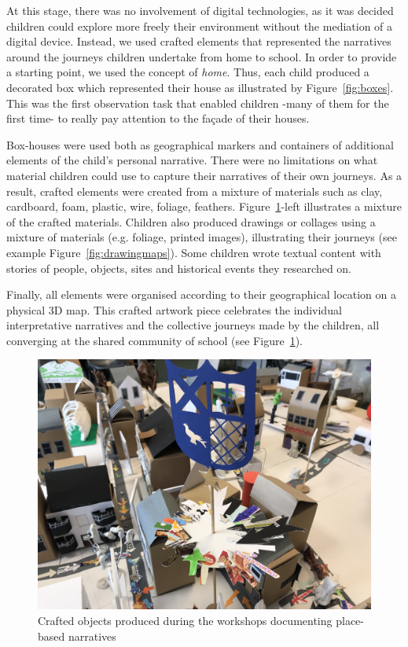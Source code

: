 \documentclass[acmlarge,screen,dvipsnames]{acmart}
\begin{document}
At this stage, there was no involvement of digital technologies, as it was
decided children could explore more freely their environment without the
mediation of a digital device. Instead, we used crafted elements that represented 
the narratives around the journeys children undertake from home to school. 
In order to provide a starting point, we used the concept of \emph{home}. Thus, each child produced a decorated box
which represented their house as illustrated by Figure~\ref{fig:boxes}. This
was the first observation task that enabled children -many of them for the first time-
to really pay attention to the fa\c{c}ade of their houses. 


Box-houses were used both
as geographical markers and containers of additional elements of the child's personal narrative. 
There were no
limitations on what material children could use to capture their narratives of their own journeys.
As a result, crafted elements were created from a mixture of materials such as
clay, cardboard, foam, plastic, wire, foliage, feathers.
Figure~\ref{fig:artwork}-left illustrates a mixture of the crafted materials. Children also produced drawings or collages using a
mixture of materials (e.g. foliage, printed images), illustrating their
journeys (see example Figure~\ref{fig:drawingmaps}). Some children wrote
textual content with stories of people, objects, sites and historical events they
researched on.

Finally, all elements were organised according to their geographical location
on a physical 3D map. This crafted artwork piece celebrates the individual
interpretative narratives and the collective journeys made by the children, all
converging at the shared community of school (see Figure~\ref{fig:artwork}). 

\begin{figure}[ht] \centering
\includegraphics[width=0.7\linewidth]{images/variousassets.jpg}
\caption{Crafted objects produced during the workshops documenting place-based
narratives} \label{fig:artwork} 
\end{figure}
\end{document}
